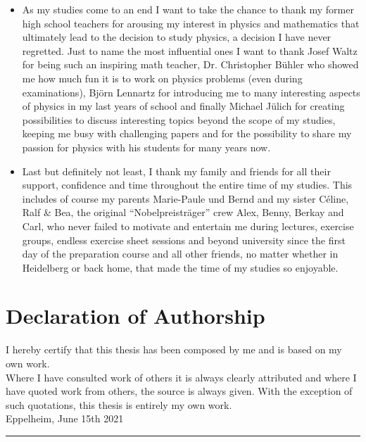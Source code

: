 \begin{itemize}
	\item As my studies come to an end I want to take the chance to thank my former high school teachers for arousing my interest in physics and mathematics that ultimately lead to the decision to study physics, a decision I have never regretted. Just to name the most influential ones I want to thank Josef Waltz for being such an inspiring math teacher,  Dr. Christopher B\"uhler who showed me how much fun it is to work on physics problems (even during examinations), Bj\"orn Lennartz for introducing me to many interesting aspects of physics in my last years of school and finally Michael J\"ulich for creating possibilities to discuss interesting topics beyond the scope of my studies, keeping me busy with challenging papers and for the possibility to share my passion for physics with his students for many years now.	
	\item Last but definitely not least, I thank my family and friends for all their support, confidence and time throughout the entire time of my studies. This includes of course my parents Marie-Paule und Bernd and my sister C\'{e}line, Ralf \& Bea, the original \enquote{Nobelpreistr\"ager} crew Alex, Benny, Berkay and Carl, who never failed to motivate and entertain me during lectures, exercise groups, endless exercise sheet sessions and beyond university since the first day of the preparation course and all other friends, no matter whether in Heidelberg or back home, that made the time of my studies so enjoyable.
\end{itemize}
\hfill
\thispagestyle{plain}
\section*{Declaration of Authorship}
I hereby certify that this thesis  has been composed by me and is based on my own work. \\
 Where I have consulted work of others it is always clearly attributed and where I have quoted work from others, the source is always given. With the exception of such quotations, this thesis is entirely my own work.    \\
 
Eppelheim, June 15th 2021 \hfill \rule{60mm}{.15mm} \par \vspace{-0.4em}
\hfill \@author
\vfill
\makeatother 